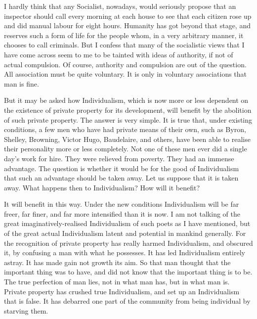 I hardly think that any Socialist, nowadays, would seriously propose that an inspector should call every morning at each house to see that each citizen rose up and did manual labour for eight hours. Humanity has got beyond that stage, and reserves such a form of life for the people whom, in a very arbitrary manner, it chooses to call criminals. But I confess that many of the socialistic views that I have come across seem to me to be tainted with ideas of authority, if not of actual compulsion. Of course, authority and compulsion are out of the question. All association must be quite voluntary. It is only in voluntary associations that man is fine.\par

But it may be asked how Individualism, which is now more or less dependent on the existence of private property for its development, will benefit by the abolition of such private property. The answer is very simple. It is true that, under existing conditions, a few men who have had private means of their own, such as Byron, Shelley, Browning, Victor Hugo, Baudelaire, and others, have been able to realise their personality more or less completely. Not one of these men ever did a single day’s work for hire. They were relieved from poverty. They had an immense advantage. The question is whether it would be for the good of Individualism that such an advantage should be taken away. Let us suppose that it is taken away. What happens then to Individualism? How will it benefit?\par

It will benefit in this way. Under the new conditions Individualism will be far freer, far finer, and far more intensified than it is now. I am not talking of the great imaginatively-realised Individualism of such poets as I have mentioned, but of the great actual Individualism latent and potential in mankind generally. For the recognition of private property has really harmed Individualism, and obscured it, by confusing a man with what he possesses. It has led Individualism entirely astray. It has made gain not growth its aim. So that man thought that the important thing was to have, and did not know that the important thing is to be. The true perfection of man lies, not in what man has, but in what man is. Private property has crushed true Individualism, and set up an Individualism that is false. It has debarred one part of the community from being individual by starving them.\par

